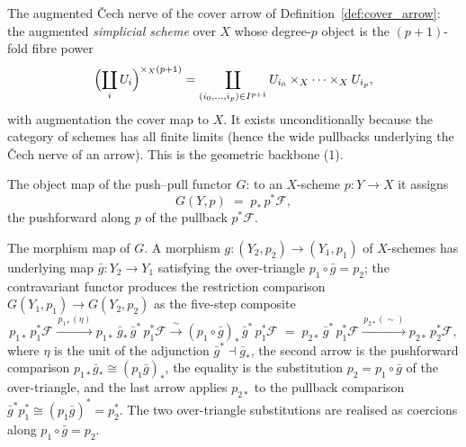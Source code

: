 \begin{definition}
  \label{def:cover_cech_nerve}
  The augmented {\v C}ech nerve of the cover arrow of
  Definition~\ref{def:cover_arrow}: the augmented \emph{simplicial scheme} over
  \(X\) whose degree-\(p\) object is the \((p+1)\)-fold fibre power
  \[
    \Bigl(\coprod_{i} U_i\Bigr)^{\times_X (p+1)}
      = \coprod_{(i_0, \ldots, i_p) \in I^{p+1}}
        U_{i_0} \times_X \cdots \times_X U_{i_p},
  \]
  with augmentation the cover map to \(X\). It exists unconditionally because the
  category of schemes has all finite limits (hence the wide pullbacks underlying the
  {\v C}ech nerve of an arrow). This is the geometric backbone (1).
\end{definition}

\begin{definition}
  \label{def:push_pull_obj}
  The object map of the push--pull functor \(G\): to an \(X\)-scheme
  \(p : Y \to X\) it assigns
  \[
    G(Y, p) \;=\; p_*\, p^*\mathcal{F},
  \]
  the pushforward along \(p\) of the pullback \(p^*\mathcal{F}\).
\end{definition}

\begin{definition}
  \label{def:push_pull_map}
  The morphism map of \(G\). A morphism \(g : (Y_2, p_2) \to (Y_1, p_1)\) of
  \(X\)-schemes has underlying map \(\bar g : Y_2 \to Y_1\) satisfying the
  over-triangle \(p_1 \circ \bar g = p_2\); the contravariant functor produces the
  restriction comparison \(G(Y_1, p_1) \to G(Y_2, p_2)\) as the five-step composite
  \[
    p_{1*}\,p_1^*\mathcal{F}
      \xrightarrow{\,p_{1*}(\eta)\,}
    p_{1*}\,\bar g_*\,\bar g^*\,p_1^*\mathcal{F}
      \xrightarrow{\,\sim\,}
    (p_1 \circ \bar g)_*\,\bar g^*\,p_1^*\mathcal{F}
      \;=\;
    p_{2*}\,\bar g^*\,p_1^*\mathcal{F}
      \xrightarrow{\,p_{2*}(\sim)\,}
    p_{2*}\,p_2^*\mathcal{F},
  \]
  where \(\eta\) is the unit of the adjunction \(\bar g^* \dashv \bar g_*\), the
  second arrow is the pushforward comparison \(p_{1*}\bar g_* \cong (p_1 \bar g)_*\),
  the equality is the substitution \(p_2 = p_1 \circ \bar g\) of the over-triangle,
  and the last arrow applies \(p_{2*}\) to the pullback comparison
  \(\bar g^* p_1^* \cong (p_1 \bar g)^* = p_2^*\). The two over-triangle
  substitutions are realised as coercions along \(p_1 \circ \bar g = p_2\).
\end{definition}

